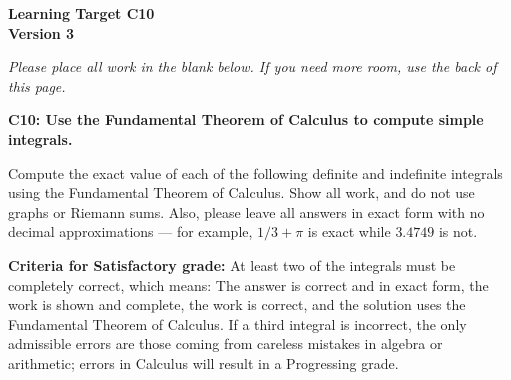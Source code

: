 \documentclass[10pt]{article}
\begin{document}
	\vspace*{0in}

		\begin{center}
			\textbf{Learning Target C10 \\
			Version 3} \\
		\end{center}

\emph{Please place all work in the blank below. If you need more room, use the back of this page.}

\begin{framed}
	\textbf{\textbf{C10:} Use the Fundamental Theorem of Calculus to compute simple integrals.}
\end{framed}

Compute the exact value of each of the following definite and indefinite integrals using the Fundamental Theorem of Calculus. Show all work, and do not use graphs or Riemann sums. Also, please leave all answers in exact form with no decimal approximations --- for example, $1/3 + \pi$ is exact while $3.4749$ is not. 


\begin{enumerate}
    \item $\displaystyle{\int_0^2 (x^3 + x + 2) \, dx}$
    \item $\displaystyle{\int_0^{\pi} \cos(t) \, dt$
    \item $\displaystyle{\int_0^1 (\sqrt{x} - x^2) \, dx}$
\end{enumerate}

\vfill


\begin{small}
    \begin{framed}
        	\textbf{Criteria for Satisfactory grade:} At least two of the integrals must be completely correct, which means: The answer is correct and in exact form, the work is shown and complete, the work is correct, and the solution uses the Fundamental Theorem of Calculus. If a third integral is incorrect, the only admissible errors are those coming from careless mistakes in algebra or arithmetic; errors in Calculus will result in a Progressing grade. 
    \end{framed}

\end{small}
\end{document}
